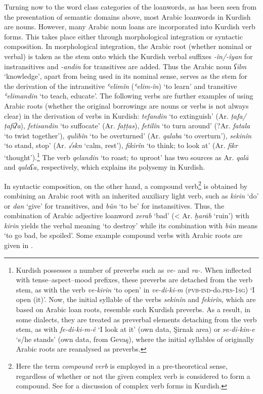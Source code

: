 \documentclass[output=paper]{langsci/langscibook}
\begin{document}
Turning now to the word class categories of the loanwords, as has been seen from the presentation of semantic domains above, most Arabic loanwords in Kurdish are nouns. However, many Arabic noun loans are incorporated into Kurdish verb forms. This takes place either through morphological integration or syntactic composition. In morphological integration, the Arabic root (whether nominal or verbal) is taken as the stem onto which the Kurdish verbal suffixes \textit{-în/-îyan} for instransitives and \textit{{}-andin} for transitives are added. Thus the Arabic noun \textit{ʕilm} ‘knowledge’, apart from being used in its nominal sense, serves as the stem for the derivation of the intransitive \textit{ʿelimîn} (\textit{ʿelim-în}) ‘to learn’ and transitive \textit{ʿelimandin} ‘to teach, educate’. The following verbs are further examples of using Arabic roots (whether the original borrowings are nouns or verbs is not always clear) in the derivation of verbs in Kurdish: \textit{tefandin} ‘to extinguish’ (Ar. \textit{ṭafa/ṭafiʔa}), \textit{fetisandin} ‘to suffocate’ (Ar. \textit{faṭṭas}), \textit{fetilîn} ‘to turn around’ (?Ar. \textit{fatala} ‘to twist together’), \textit{qulibîn} ‘to be overturned’ (Ar. \textit{qalaba} ‘to overturn’), \textit{sekinîn} ‘to stand, stop’ (Ar. \textit{√skn} ‘calm, rest’), \textit{fikirîn} ‘to think; to look at’ (Ar. \textit{fikr} ‘thought’).\footnote{Kurdish possesses a number of preverbs such as \textit{ve-} and \textit{ra-}. When inflected with tense--aspect--mood prefixes, these preverbs are detached from the verb stem, as with the verb \textit{ve-kirin} ‘to open’ in \textit{ve-di-ki-m} (\textsc{pvb-ind}{}-do.\textsc{prs-1sg}) ‘I open (it)’. Now, the initial syllable of the verbs \textit{sekinîn} and \textit{fekirîn}, which are based on Arabic loan roots, resemble such Kurdish preverbs. As a result, in some dialects, they are treated as preverbal elements detaching from the verb stem, as with \textit{fe-di-ki-m-ê} ‘I look at it’ (own data, Şirnak area) or \textit{se-di-kin-e} ‘s/he stands’ (own data, from Gevaş), where the initial syllables of originally Arabic roots are reanalysed as preverbs.}  The verb \textit{qelandin} ‘to roast; to uproot’ has two sources as Ar. \textit{qalā} and \textit{qalaʕa,} respectively, which explains its polysemy in Kurdish. 

In syntactic composition, on the other hand, a compound verb\footnote{Here the term \textit{compound} \textit{verb} is employed in a pre-theoretical sense, regardless of whether or not the given complex verb is considered to form a compound. See \citet{Haig2002} for a discussion of complex verb forms in Kurdish.}  is obtained by combining an Arabic root with an inherited auxiliary light verb, such as \textit{kirin} ‘do’ or \textit{dan} ‘give’ for transitives, and \textit{bûn} ‘to be’ for instansitives. Thus, the combination of Arabic adjective loanword \textit{xerab} ‘bad’ (< Ar. \textit{ḫarāb} ‘ruin’) with \textit{kirin} yields the verbal meaning ‘to destroy’ while its combination with \textit{bûn} means ‘to go bad, be spoiled’. Some example compound verbs with Arabic roots are given in .
\end{document}
